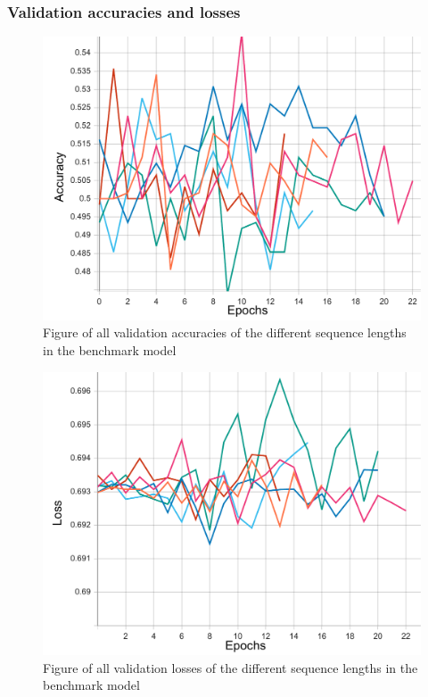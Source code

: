 \subsubsection{Validation accuracies and losses}
\begin{figure}[ht]
    \centering
    \includegraphics[width=0.95\columnwidth]{figures/results/benchmark/benchmark_all_acc.pdf}
    \caption[Validation accuracies for benchmark model]{Figure of all validation accuracies of the different sequence lengths in the benchmark model}
    \label{fig:benchmark_all_accuracy}
\end{figure}
\FloatBarrier

\begin{figure}[ht]
    \centering
    \includegraphics[width=0.95\columnwidth]{figures/results/benchmark/benchmark_all_loss.pdf}
    \caption[Validation losses for benchmark model]{Figure of all validation losses of the different sequence lengths in the benchmark model}
    \label{fig:benchmark_all_loss}
\end{figure}
\FloatBarrier



